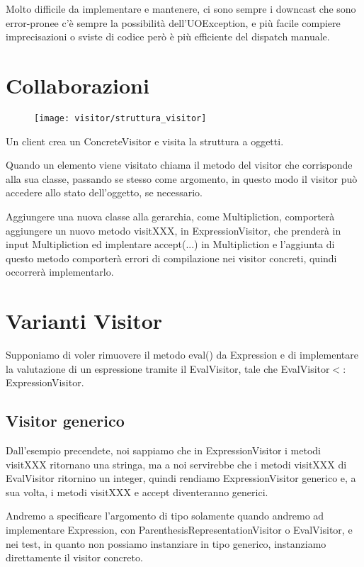 Molto difficile da implementare e mantenere, ci sono sempre i downcast che sono error-pronee c’è sempre la possibilità dell’UOException, e più facile compiere 
imprecisazioni o sviste di codice però è più efficiente del dispatch manuale.

\section{Collaborazioni}

\begin{figure}[H]
  \centering
  \texttt{[image: visitor/struttura\_visitor]}
\end{figure}

Un client crea un ConcreteVisitor e visita la struttura a oggetti.

Quando un elemento viene visitato chiama il metodo del visitor che corrisponde alla sua classe, passando se stesso come argomento, in questo modo il visitor può 
accedere allo stato dell’oggetto, se necessario.
\smallskip

Aggiungere una nuova classe alla gerarchia, come Multipliction, comporterà aggiungere un nuovo metodo visitXXX, in ExpressionVisitor, che prenderà in input 
Multipliction ed implentare accept(...) in Multipliction e l'aggiunta di questo metodo comporterà errori di compilazione nei visitor concreti, quindi occorrerà 
implementarlo.

\section{Varianti Visitor}

Supponiamo di voler rimuovere il metodo eval() da Expression e di implementare la valutazione di un espressione tramite il EvalVisitor, tale che 
EvalVisitor$<:$ExpressionVisitor.

\subsection{Visitor generico}

Dall'esempio precendete, noi sappiamo che in ExpressionVisitor i metodi visitXXX ritornano una stringa, ma a noi servirebbe che i metodi visitXXX di EvalVisitor 
ritornino un integer, quindi rendiamo ExpressionVisitor generico e, a sua volta, i metodi visitXXX e accept diventeranno generici.

Andremo a specificare l'argomento di tipo solamente quando andremo ad implementare Expression, con ParenthesisRepresentationVisitor o EvalVisitor, e nei test, in quanto
non possiamo instanziare in tipo generico, instanziamo direttamente il visitor concreto.

